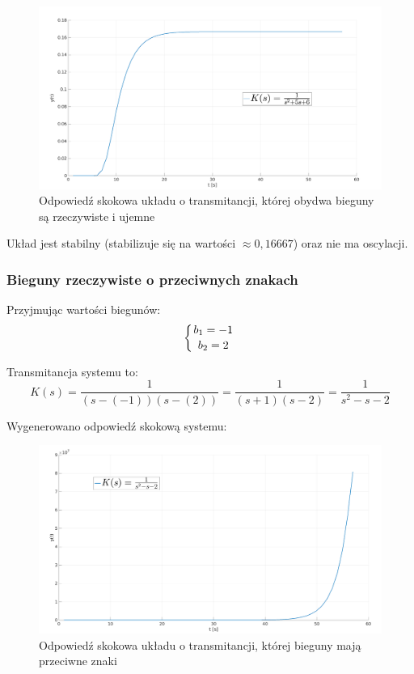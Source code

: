 \documentclass[12pt]{article}
\begin{document}
\begin{figure}[H]
    \centering
    \includegraphics[width=18cm]{rzeczywiste_ujemne.png}
    \caption{Odpowiedź skokowa układu o transmitancji, której obydwa bieguny są rzeczywiste i ujemne}
\end{figure}


Układ jest stabilny (stabilizuje się na wartości $\approx 0,16667$) oraz nie ma oscylacji.


\subsubsection{Bieguny rzeczywiste o przeciwnych znakach}

Przyjmując wartości biegunów:
\begin{equation*}
    \left\{{{b_1 = -1}\atop {b_2 = 2}}\right.
\end{equation*}

Transmitancja systemu to:
\begin{equation}
    K(s) = \frac{1}{(s-(-1))(s-(2))} = \frac{1}{(s+1)(s-2)} = \frac{1}{s^2-s-2}
\end{equation}

Wygenerowano odpowiedź skokową systemu:

\begin{figure}[H]
    \centering
    \includegraphics[width=18cm]{rzeczywiste_przeciwne_znaki.png}
    \caption{Odpowiedź skokowa układu o transmitancji, której bieguny mają przeciwne znaki}
\end{figure}
\end{document}
